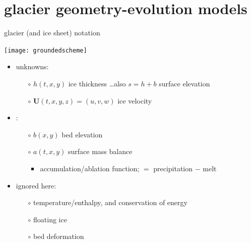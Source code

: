 \documentclass[xcolor={dvipsnames}]{beamer}
\newcommand\bq{\mathbf{q}}
\newcommand\bx{\mathbf{x}}
\newcommand\bF{\mathbf{F}}
\newcommand\bU{\mathbf{U}}
\newcommand\Div{\nabla\cdot}
\begin{document}


\section{glacier geometry-evolution models}

\begin{frame}{glacier (and ice sheet) notation}

\begin{center}
\texttt{[image: groundedscheme]}
\end{center}

\begin{itemize}
\item unknowns:
  \begin{itemize}
  \item[$\circ$]  $h(t,x,y)$ ice thickness \hfill \dots also $s=h+b$ surface elevation
  \item[$\circ$]  $\bU(t,x,y,z) = (u,v,w)$ ice velocity
  \end{itemize}
\item {}:
  \begin{itemize}
  \item[$\circ$]  $b(x,y)$ bed elevation 
  \item[$\circ$]  $a(t,x,y)$ surface mass balance  
    \begin{itemize}
    \item accumulation/ablation function; $=$ precipitation $-$ melt
    \end{itemize}
  \end{itemize}
\item ignored here:
  \begin{itemize}
  \item[$\circ$]  temperature/enthalpy, and conservation of energy
  \item[$\circ$]  floating ice
  \item[$\circ$]  bed deformation
  \end{itemize}
\end{itemize}
\end{frame}
\end{document}
